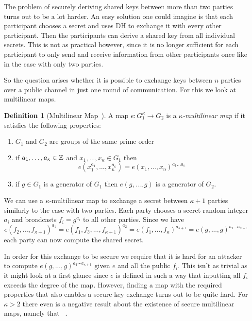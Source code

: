\documentclass[english]{scrartcl}
\theoremstyle{plain}
\theoremstyle{definition}
\newtheorem{definition}[lemma]{Definition}
\begin{document}
    The problem of securely deriving shared keys between more than two parties turns out to be a lot harder. An easy solution one could imagine is that each participant chooses a secret and uses DH to exchange it with every other participant. Then the participants can derive a shared key from all individual secrets.
    This is not as practical however, since it is no longer sufficient for each participant to only send and receive information from other participants once like in the case with only two parties.

    So the question arises whether it is possible to exchange keys between $n$ parties over a public channel in just one round of communication.
    For this we look at multilinear maps.

    \begin{definition}[Multilinear Map~\cite{boneh2003applications}]
        A map $e: G_1^\kappa \rightarrow G_2$ is a \emph{$\kappa$-multilinear map} if it satisfies the following properties:
        \begin{enumerate}
            \item $G_1$ and $G_2$ are groups of the same prime order
            \item if $a_1,\dots ,a_\kappa \in \mathbb{Z}$ and $x_1, \dots, x_\kappa \in G_1$ then
                \begin{equation*}
                    e\left( x_1^{a_1}, \dots, x_n^{a_\kappa} \right) = e(x_1, \dots, x_n)^{a_1\dots a_\kappa}
                \end{equation*}
            \item if $g \in G_1$ is a generator of $G_1$ then $e(g, \dots, g)$ is a generator of $G_2$.
        \end{enumerate}
    \end{definition}
    \noindent
    We can use a $\kappa$-multilinear map to exchange a secret between $\kappa + 1$ parties similarly to the case with two parties. Each party chooses a secret random integer $a_i$ and broadcasts $f_i = g^{a_i}$ to all other parties.
    Since we have
    \begin{equation*}
        e(f_2, \dots, f_{\kappa+1})^{a_1} = e(f_1, f_3, \dots, f_{\kappa+1})^{a_2} = e(f_1, \dots, f_\kappa)^{a_{\kappa+1}} = e(g, \dots, g)^{a_1 \cdots a_{\kappa+1}}
    \end{equation*}
    each party can now compute the shared secret.

    In order for this exchange to be secure we require that it is hard for an attacker to compute $e(g, \dots, g)^{a_1 \cdots a_{\kappa+1}}$ given $e$ and all the public $f_i$. This isn't as trivial as it might look at a first glance since $e$ is defined in such a way that inputting all $f_i$ exceeds the degree of the map.
    However, finding a map with the required properties that also enables a secure key exchange turns out to be quite hard.
    For $\kappa > 2$ there even is a negative result about the existence of secure multilinear maps, namely that ~\cite{boneh2003applications}.
\end{document}

